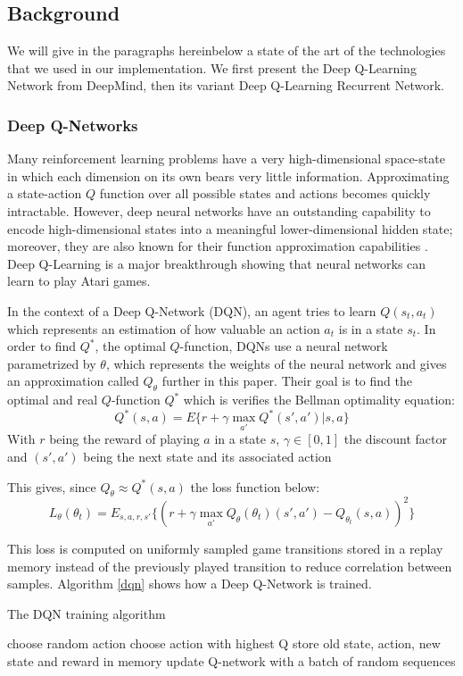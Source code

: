\documentclass[letterpaper]{article}
\begin{document}
\subsection{Background} We will give in the paragraphs hereinbelow a state of
the art of the technologies that we used in our implementation. We first present
the Deep Q-Learning Network from DeepMind, then its variant Deep Q-Learning
Recurrent Network.

\subsubsection{Deep Q-Networks}
Many reinforcement learning problems have a very high-dimensional space-state
in which each dimension on its own bears very little information. Approximating
a state-action $Q$ function over all possible states and actions becomes quickly
intractable. However, deep neural networks have an outstanding capability to
encode high-dimensional states into a meaningful lower-dimensional hidden state;
moreover, they are also known for their function approximation capabilities
\citep{Hornik1991}. Deep Q-Learning \citep{Mnih2015} is a major breakthrough
showing that neural networks can learn to play Atari games.

In the context of a Deep Q-Network (DQN), an agent tries to learn
$Q(s_t,a_t)$ which represents an
estimation of how valuable an action $a_t$ is in a state $s_t$. In order to
find $Q^*$, the optimal $Q$-function, DQNs use a neural network
parametrized by $\theta$, which represents the weights of the neural network
and gives an approximation called $Q_\theta$ further in this paper. Their goal
is to find the optimal and real $Q$-function $Q^*$ which is verifies the Bellman
optimality equation:
$$ Q^*(s,a) = E\{r + \gamma \max_{a'}Q^*(s',a')|s,a\} $$
With $r$ being the reward of playing $a$ in a state $s$, $\gamma\in [0,1]$ the
discount factor and $(s',a')$ being the next state and its associated action

This gives, since $Q_{\theta} \approx Q^*(s,a)$ the loss function below:
$$ L_\theta(\theta_t) = E_{s,a,r,s'}\{(r +\gamma \max_{a'}Q_\theta(\theta_t)(s' , a' )-Q_{\theta_t}(s,a))^2\}$$

This loss is computed on uniformly sampled game transitions stored in a
replay memory instead of the previously played transition to reduce correlation
between samples. Algorithm \ref{dqn} shows how a Deep Q-Network is trained.
\begin{algorithm}
\caption{The DQN training algorithm}\label{dqn}
\begin{algorithmic}[1]
				\State choose random action
			\Else
				\State choose action with highest Q
			\EndIf
			\State store old state, action, new state and reward in memory
		\EndWhile
			\State update Q-network with a batch of random sequences
		\EndFor
	\EndFor
\end{algorithmic}
\end{algorithm}
\end{document}
